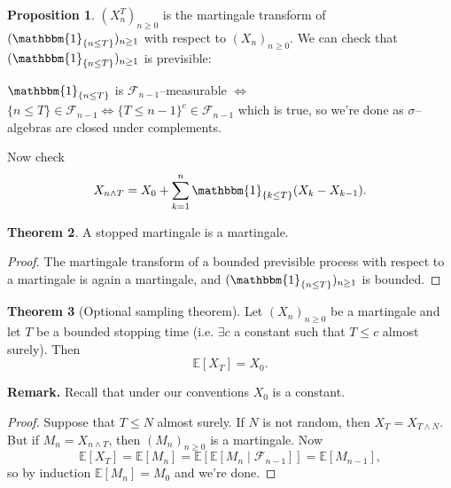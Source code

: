 \documentclass{article}
\theoremstyle{definition}
\newtheorem{theorem}{Theorem}[section]
\newtheorem{prop}[theorem]{Proposition}
\begin{document}
\begin{prop}
    $(X_n^T)_{n\ge 0}$ is the martingale transform of $(\mathbbm{1}_{\{n\le T\}})_{n\ge 1}$ with respect to $(X_n)_{n\ge 0}$. We can check that $(\mathbbm{1}_{\{n\le T\}})_{n\ge 1}$ is previsible:
    \vspace{1mm}
    
    $\mathbbm{1}_{\{n \le T\}}$ is $\mathcal{F}_{n-1}$--measurable $\iff$ $\{n\le T\}\in \mathcal{F}_{n-1} \iff \{T\le n-1\}^{c} \in \mathcal{F}_{n-1}$ which is true, so we're done as $\sigma$--algebras are closed under complements. 
    \vspace{1mm}
    
    Now check
    \[
    X_{n \wedge T} = X_0 + \sum_{k=1}^{n} \mathbbm{1}_{\{k\le T\}}(X_k-X_{k-1}).
    \]
\end{prop}
\begin{theorem}
    A stopped martingale is a martingale.
\end{theorem}
\begin{proof}
    The martingale transform of a bounded previsible process with respect to a martingale is again a martingale, and $(\mathbbm{1}_{\{n\le T\}})_{n\ge 1}$ is bounded.
\end{proof}
\begin{theorem}[Optional sampling theorem]
    Let $(X_n)_{n\ge 0}$ be a martingale and let $T$ be a bounded stopping time (i.e. $\exists c$ a constant such that $T\le c$ almost surely). Then
    \[
    \mathbb{E}[X_T]=X_0.
    \]
\end{theorem}
\textbf{Remark.} Recall that under our conventions $X_0$ is a constant.
\begin{proof}
    Suppose that $T\le N$ almost surely. If $N$ is not random, then $X_T=X_{T \wedge N}$. But if $M_n=X_{n \wedge T}$, then $(M_n)_{n\ge 0}$ is a martingale. Now \[
    \mathbb{E}[X_T]=\mathbb{E}[M_n] = \mathbb{E}[\mathbb{E}[M_n \mid \mathcal{F}_{n-1}]]=\mathbb{E}[M_{n-1}],
    \]
    so by induction $\mathbb{E}[M_n]=M_0$ and we're done.
\end{proof}
\end{document}

